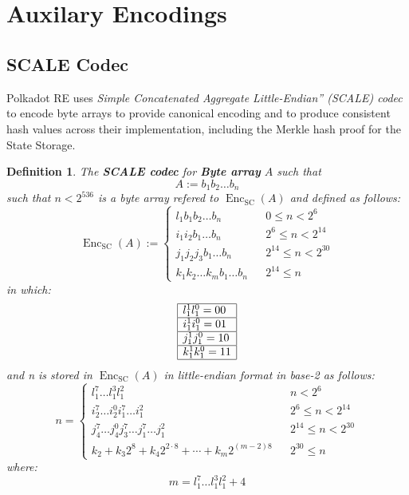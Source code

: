\documentclass{article}
\newcommand{\assign}{:=}
\newcommand{\cdummy}{\cdot}
\newcommand{\nosymbol}{}
\newcommand{\tmem}[1]{{\em #1\/}}
\newcommand{\tmop}[1]{\ensuremath{\operatorname{#1}}}
\newcommand{\tmstrong}[1]{\textbf{#1}}
\newcommand{\tmtextbf}[1]{{\bfseries{#1}}}
\newcommand{\tmtextit}[1]{{\itshape{#1}}}
\newtheorem{definition}{Definition}
\providecommand{\cdummy}{{\cdot}}
\providecommand{\nosymbol}{}
\providecommand{\tmem}[1]{\tmtextit{#1}}
\providecommand{\tmop}[1]{\ensuremath{\mathrm{#1}}}
\providecommand{\tmstrong}[1]{\tmtextbf{#1}}
\providecommand{\tmtextbf}[1]{\tmtextbf{#1}}
\providecommand{\tmtextit}[1]{\tmtextit{#1}}
\newtheorem{definition}{Definition}
\begin{document}
\

\

\section{Auxilary Encodings}

\subsection{SCALE Codec}\label{sect-scale-codec}

Polkadot RE uses {\tmem{Simple Concatenated Aggregate Little-Endian'' (SCALE)
codec}} to encode byte arrays to provide canonical encoding and to produce
consistent hash values across their implementation, including the Merkle hash
proof for the State Storage.

\begin{definition}
  The {\tmstrong{SCALE codec}} for {\tmstrong{Byte array}} $A$ such that
  \[ A \assign b_1 b_2 \ldots b_n \]
  such that $n < 2^{536}$ is a byte array refered to $\tmop{Enc}_{\tmop{SC}}
  (A)$ and defined as follows:
  \[ \tmop{Enc}_{\tmop{SC}} (A) \assign \left\{ \begin{array}{lll}
       l^{\nosymbol}_1 b_1 b_2 \ldots b_n &  & 0 \leqslant n < 2^6\\
       i^{\nosymbol}_1 i^{\nosymbol}_2 b_1 \ldots b_n &  & 2^6 \leqslant n <
       2^{14}\\
       j^{\nosymbol}_1 j^{\nosymbol}_2 j_3 b_1 \ldots b_n &  & 2^{14}
       \leqslant n < 2^{30}\\
       k_1^{\nosymbol} k_2^{\nosymbol} \ldots k_m^{\nosymbol} b_1 \ldots b_n &
       & 2^{14} \leqslant n
     \end{array} \right. \]
  in which:{\hspace{0.17em}}
  \[ \begin{array}{|l|}
       \hline
       l^1_1 l_1^0 = 00\\
       \hline
       i^1_1 i_1^0 = 01\\
       \hline
       j^1_1 j_1^0 = 10\\
       \hline
       k^1_1 k_1^0 = 11\\
       \hline
     \end{array} \]
  and n is stored in $\tmop{Enc}_{\tmop{SC}} (A)$ in little-endian format in
  base-2 as follows:
  \[ n = \left\{ \begin{array}{lll}
       l^7_1 \ldots l^3_1 l^2_1 &  & n < 2^6\\
       i_2^7 \ldots i_2^0 i_1^7 \ldots i^2_1^{\nosymbol} &  & 2^6 \leqslant n
       < 2^{14}\\
       j_4^7 \ldots j_4^0 j_3^7 \ldots j_1^7 \ldots j^2_1 &  & 2^{14}
       \leqslant n < 2^{30}\\
       k_2 + k_3 2^8 + k_4 2^{2 \cdummy 8} + \cdots + k_m 2^{(m - 2) 8} &  &
       2^{30} \leqslant n
     \end{array} \right. \]
  where:
  \[ m = l^7_1 \ldots l^3_1 l^2_1 + 4 \]
\end{definition}
\end{document}
